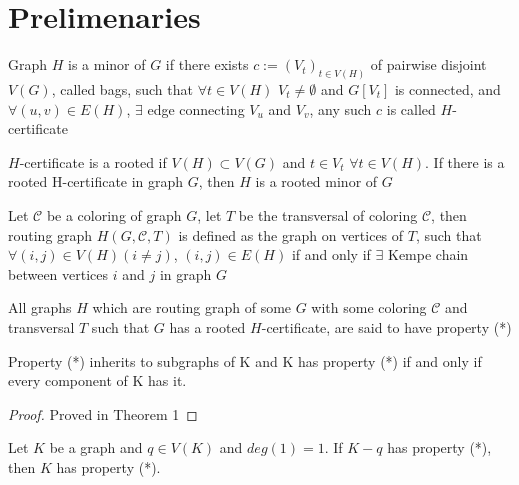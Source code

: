 \chapter{Prelimenaries}

\begin{defn}[H-certificate]
    Graph $H$ is a minor of $G$ if there exists $c := (V_{t})_{t \in V(H)}$ of pairwise disjoint $V(G)$,
     called bags, such that $\forall t \in V(H)$ $V_{t} \neq \emptyset$ and $G[V_{t}]$ is connected, and $\forall (u,v) \in E(H)$,
     $\exists$ edge connecting $V_{u}$ and $V_{v}$, any such $c$ is called $H$-certificate
\end{defn}

\begin{defn}
    $H$-certificate is a rooted if $V(H) \subset V(G)$ and $t \in V_{t}$ $\forall t \in V(H)$. If there is a rooted H-certificate in graph $G$,
    then $H$ is a rooted minor of $G$
\end{defn}

\begin{defn}
Let $\mathcal{C}$ be a coloring of graph $G$, let $T$ be the transversal of coloring $\mathcal{C}$, 
then routing graph $H(G, \mathcal{C}, T)$ is defined as the graph on vertices of $T$, 
such that $\forall (i,j) \in V(H) (i \neq j)$, $(i,j) \in E(H)$ if and only if 
$\exists$ Kempe chain between vertices $i$ and $j$ in graph $G$
\end{defn}

\begin{defn}[Property (*)]
    All graphs $H$ which are routing graph of some $G$ with some coloring $\mathcal{C}$ and transversal $T$
    such that $G$ has a rooted $H$-certificate, are said to have property (*)
\end{defn}

\begin{thm}
\label{thm:1}
    Property (*) inherits to subgraphs of K and K has property (*) if and only if every component of K has it.
\end{thm}

\begin{proof}
    Proved in \cite{matthias_2022} Theorem 1
\end{proof}

\begin{thm}
\label{thm:2}
    Let $K$ be a graph and $q \in V(K)$ and $deg(1) = 1$. If $K - q$ has property (*), then $K$ has property (*).
\end{thm}

